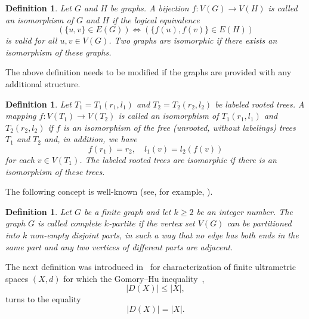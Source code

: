 \documentclass[pdflatex,sn-mathphys-num]{sn-jnl}%
\theoremstyle{thmstyleone}%
\theoremstyle{thmstyletwo}%
\theoremstyle{thmstylethree}%
\newtheorem{Definition}[Theorem]{Definition}
\theoremstyle{thmstyletwo}%
\theoremstyle{thmstylethree}%
\begin{document}
\begin{Definition}\label{odwd}
Let $G$ and $H$ be graphs. A bijection $f: V(G) \to V(H)$ is called an {\it isomorphism}
of $G$ and $H$ if the logical equivalence
\[
(\{u,v\}\in E(G)) \iff (\{f(u),f(v)\}\in E(H))
\]
is valid for all $u,v\in V(G)$. Two graphs are {\it isomorphic} if there
exists an isomorphism of these graphs. 
\end{Definition}


The above definition needs to be modified if the graphs are provided with any additional structure.



\begin{Definition}\label{qwwmgg}
Let $T_1=T_1(r_1,l_1)$ and $T_2=T_2(r_2,l_2)$ be labeled rooted trees. A mapping $f: V(T_1)\to V(T_2)$  is called an 
{\it isomorphism of $T_1(r_1,l_1)$ and $T_2(r_2,l_2)$} if $f$ is an isomorphism of the free (unrooted, without labelings) trees $T_1$ and $T_2$ and, in addition, we have 
\begin{equation*}
    f(r_1)=r_2, \quad l_1(v)=l_2(f(v))
\end{equation*}
for each
$v\in V(T_1)$.
 The labeled rooted trees 
are isomorphic if there is an isomorphism of these trees.
\end{Definition}


















The following concept is well-known  (see, for example, \cite[p.~17]{Diestel2017}). 

\begin{Definition}\label{scfr} Let $G$ be a finite graph and let $k \geq 2$ be an integer number. The graph $G$
is called {\it complete $k$-partite} if the vertex set $V(G)$ can be partitioned into $k$ non-empty
disjoint parts, in such a way that no edge has both ends in the same part and
any two vertices of different parts are adjacent.
\end{Definition}



The next definition was introduced in~\cite{PD2014JMS} for characterization of finite ultrametric spaces $(X,d)$ for which the Gomory--Hu inequality~\cite{GH1961S},
\begin{equation*}
    |D(X)|\leq |X|,
\end{equation*}
turns to the equality
\begin{equation*}
    |D(X)|=|X|.
\end{equation*}
\end{document}
